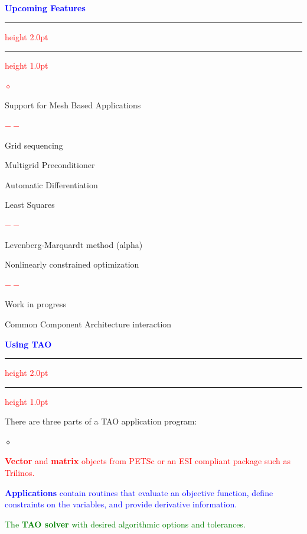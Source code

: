 \documentclass{seminar}
\newcommand{\reddash}{\textcolor{red}{$--$}}
\newcommand{\reddiamond}{\textcolor{red}{$\diamond$}}
\newcommand{\blackdiamond}{\textcolor{black}{$\diamond$}}
\newcommand{\redstripe}{\textcolor{red}{\hrule height 2.0pt\hfil}
             \vspace{-1.8pt}
             \textcolor{red}{\hrule height 1.0pt\hfil}
}
\newcommand{\heading}[1]{%
   \centerline{\textcolor{blue}{\textbf{#1}}}%
    \redstripe%
    \bigskip
}
\begin{document}
\begin{slide}
\heading{Upcoming Features}

\begin{list}{\reddiamond}
{ \setlength{\itemsep}{0pt}}

\item Support for Mesh Based Applications
\begin{list}{\reddash}{}
\item Grid sequencing
\item Multigrid Preconditioner
\item Automatic Differentiation
\end{list}
 
\item Least Squares
\begin{list}{\reddash}{}
\item
Levenberg-Marquardt method (alpha)
\end{list}

\item
Nonlinearly constrained optimization
\begin{list}{\reddash}{}
\item
Work in progress
\end{list}

\item Common Component Architecture interaction

\end{list}

\vfill

\end{slide}


\begin{slide}
\heading{Using TAO}

There are three parts of a TAO application program:
\begin{list}{\blackdiamond}{}

\item \textcolor{red}{{\bf Vector} and {\bf matrix} objects from
PETSc or an ESI compliant package such as Trilinos.}

\item \textcolor{blue}{{\bf Applications} contain routines that
evaluate an objective function, define constraints on the
variables, and provide derivative information.}

\item \textcolor{green}{The {\bf TAO solver} with desired
algorithmic options and tolerances.}


\end{list}

\end{slide}
\end{document}
